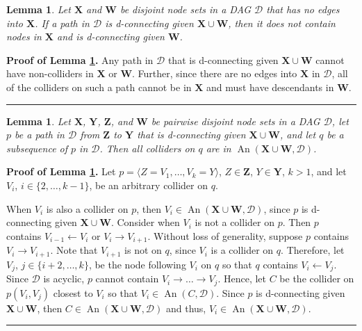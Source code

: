 \documentclass[11pt]{article}
\DeclareMathOperator{\An}{An}
\newcommand{\BlackBox}{\rule{1.5ex}{1.5ex}}  %
\newtheorem{lemma}[theorem]{Lemma}
\newcommand{\mb}[1]{\mathbf{#1}}
\newcommand{\g}[1][G]{\mathcal{#1}}
\newenvironment{proofof}[1][]{\noindent \textbf{Proof of #1.}}{\hfill\BlackBox}
\begin{document}

\begin{lemma}
\label{lem:do-helper2}
    Let $\mb{X}$ and $\mb{W}$ be disjoint node sets in a DAG $\g[D]$ that has no edges into $\mb{X}$. If a path in $\g[D]$ is d-connecting given $\mb{X} \cup \mb{W}$, then it does not contain nodes in $\mb{X}$ and is d-connecting given $\mb{W}$. 
\end{lemma}

\begin{proofof}[Lemma \ref{lem:do-helper2}]
    Any path in $\g[D]$ that is d-connecting given $\mb{X} \cup \mb{W}$ cannot have non-colliders in $\mb{X}$ or $\mb{W}$. Further, since there are no edges into $\mb{X}$ in $\g[D]$, all of the colliders on such a path cannot be in $\mb{X}$ and must have descendants in $\mb{W}$.
\end{proofof}



\begin{lemma}
\label{lem:do-helper3}
    Let $\mb{X}$, $\mb{Y}$, $\mb{Z}$, and $\mb{W}$ be pairwise disjoint node sets in a DAG $\g[D]$, let $p$ be a path in $\g[D]$ from $\mb{Z}$ to $\mb{Y}$ that is d-connecting given $\mb{X} \cup \mb{W}$, and let $q$ be a subsequence of $p$ in $\g[D]$. Then all colliders on $q$ are in $\An(\mb{X} \cup \mb{W}, \g[D])$. 
\end{lemma}

\begin{proofof}[Lemma \ref{lem:do-helper3}]
    Let $p = \langle Z=V_1, \dots, V_k=Y \rangle$, $Z \in \mb{Z}$, $Y \in \mb{Y}$, $k >1$, and let $V_i$, $i \in \{2, \dots, k-1\}$, be an arbitrary collider on $q$.

    When $V_i$ is also a collider on $p$, then $V_i \in \An(\mb{X} \cup \mb{W}, \g[D])$, since $p$ is d-connecting given $\mb{X} \cup \mb{W}$. Consider when $V_i$ is not a collider on $p$. Then $p$ contains $V_{i-1} \gets V_i$ or $V_i \to V_{i+1}$. Without loss of generality, suppose $p$ contains $V_i \to V_{i+1}$. Note that $V_{i+1}$ is not on $q$, since $V_i$ is a collider on $q$. Therefore, let $V_j$, $j \in \{i+2, \dots, k\}$, be the node following $V_i$ on $q$ so that $q$ contains $V_i \gets V_j$. Since $\g[D]$ is acyclic, $p$ cannot contain $V_{i} \to \dots \to V_j$. Hence, let $C$ be the collider on $p(V_i,V_j)$ closest to $V_i$ so that $V_i \in \An(C, \g[D])$. Since $p$ is d-connecting given $\mb{X} \cup \mb{W}$, then $C \in \An(\mb{X} \cup \mb{W}, \g[D])$ and thus, $V_i \in \An(\mb{X} \cup \mb{W}, \g[D])$.
\end{proofof}
\end{document}
